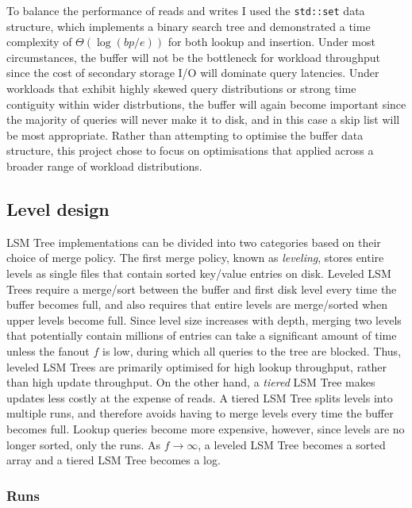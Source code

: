 \documentclass{acm}
\begin{document}
To balance the performance of reads and writes I used the \texttt{std::set} data structure, which implements a binary search tree and demonstrated a time complexity of $\Theta(\log(bp/e))$ for both lookup and insertion. Under most circumstances, the buffer will not be the bottleneck for workload throughput since the cost of secondary storage I/O will dominate query latencies. Under workloads that exhibit highly skewed query distributions or strong time contiguity within wider distrbutions, the buffer will again become important since the majority of queries will never make it to disk, and in this case a skip list will be most appropriate. Rather than attempting to optimise the buffer data structure, this project chose to focus on optimisations that applied across a broader range of workload distributions.

\subsection{Level design}

LSM Tree implementations can be divided into two categories based on their choice of merge policy. The first merge policy, known as \textit{leveling}, stores entire levels as single files that contain sorted key/value entries on disk. Leveled LSM Trees require a merge/sort between the buffer and first disk level every time the buffer becomes full, and also requires that entire levels are merge/sorted when upper levels become full. Since level size increases with depth, merging two levels that potentially contain millions of entries can take a significant amount of time unless the fanout $f$ is low, during which all queries to the tree are blocked. Thus, leveled LSM Trees are primarily optimised for high lookup throughput, rather than high update throughput. On the other hand, a \textit{tiered} LSM Tree makes updates less costly at the expense of reads. A tiered LSM Tree splits levels into multiple runs, and therefore avoids having to merge levels every time the buffer becomes full. Lookup queries become more expensive, however, since levels are no longer sorted, only the runs. As $f \rightarrow \infty$, a leveled LSM Tree becomes a sorted array and a tiered LSM Tree becomes a log.

\subsubsection{Runs}
\end{document}
